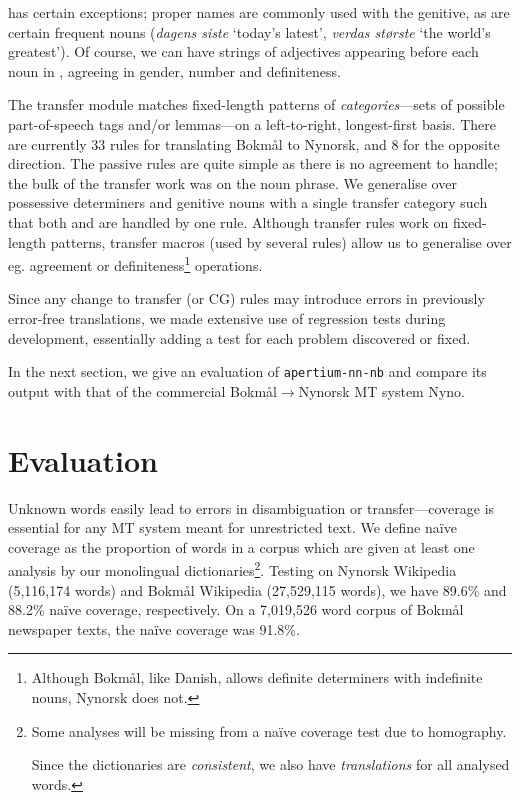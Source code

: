 \documentclass[11pt]{article}
\begin{document}
\Last has certain exceptions; proper names are commonly used with the
genitive, as are certain frequent nouns (\emph{dagens siste} `today's
latest', \emph{verdas største} `the world's greatest'). Of course, we
can have strings of adjectives appearing before each noun in
\Last[a-d], agreeing in gender, number and definiteness. 

The transfer module matches fixed-length patterns of
\emph{categories}—sets of possible part-of-speech tags and/or
lemmas—on a left-to-right, longest-first basis. There are currently 33
rules for translating Bokmål to Nynorsk, and 8 for the opposite
direction. The passive rules are quite simple as there is no agreement
to handle; the bulk of the transfer work was on the noun phrase. We
generalise over possessive determiners and genitive nouns with a
single transfer category such that both \Last[a-b] and \Last[c-d] are
handled by one rule. Although transfer rules work on fixed-length
patterns, transfer macros (used by several rules) allow us to
generalise over eg. agreement or definiteness\footnote{Although
  Bokmål, like Danish, allows definite determiners with indefinite
  nouns, Nynorsk does not.} operations.

Since any change to transfer (or CG) rules may introduce
errors in previously error-free translations, we made extensive use of
regression tests during development, essentially adding a test for
each problem discovered or fixed.

In the next section, we give an evaluation of {\tt apertium-nn-nb} and
compare its output with that of the commercial
Bokmål$\rightarrow$Nynorsk MT system Nyno.


\section{Evaluation}
\label{sec:eval}

Unknown words easily lead to errors in disambiguation or
transfer—coverage is essential for any MT system meant for
unrestricted text.  We define naïve coverage as the proportion of
words in a corpus which are given at least one analysis by our
monolingual dictionaries\footnote{Some analyses will be missing from a
  naïve coverage test due to homography. 

  Since the dictionaries are \emph{consistent}, we also have
  \emph{translations} for all analysed words.}. Testing on Nynorsk
Wikipedia (5,116,174 words) and Bokmål Wikipedia (27,529,115 words),
we have 89.6\% and 88.2\% naïve coverage, respectively. On a 7,019,526
word corpus of Bokmål newspaper texts, the naïve coverage was 91.8\%.
\end{document}
